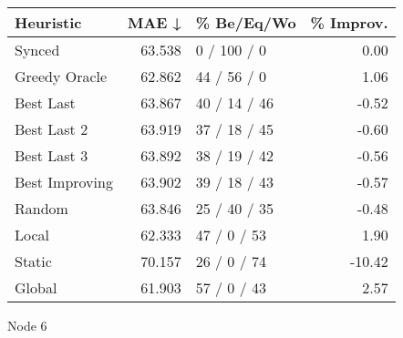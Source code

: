 \begin{tabular}{lrlr}
\toprule
\textbf{Heuristic} & \textbf{MAE ↓} & \textbf{\% Be/Eq/Wo} & \textbf{\% Improv.} \\
\midrule
            Synced &         63.538 &          0 / 100 / 0 &                0.00 \\
     Greedy Oracle &         62.862 &          44 / 56 / 0 &                1.06 \\
         Best Last &         63.867 &         40 / 14 / 46 &               -0.52 \\
       Best Last 2 &         63.919 &         37 / 18 / 45 &               -0.60 \\
       Best Last 3 &         63.892 &         38 / 19 / 42 &               -0.56 \\
    Best Improving &         63.902 &         39 / 18 / 43 &               -0.57 \\
            Random &         63.846 &         25 / 40 / 35 &               -0.48 \\
             Local &         62.333 &          47 / 0 / 53 &                1.90 \\
            Static &         70.157 &          26 / 0 / 74 &              -10.42 \\
            Global &         61.903 &          57 / 0 / 43 &                2.57 \\
\bottomrule
\end{tabular}
\caption{Node 6}
\label{tab:iid_lr05_le1_bs2_6}
